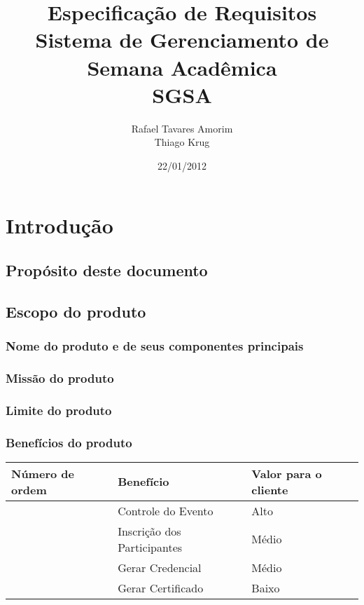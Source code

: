 \documentclass[12pt,a4paper]{article}
\begin{document}
    \title{
    	Especificação de Requisitos \\ 
    	Sistema de Gerenciamento de Semana Acadêmica \\
    	SGSA
    }
    \author{Rafael Tavares Amorim \\ Thiago Krug}
    \date{22/01/2012}
    \maketitle

	\clearpage
    
    \tableofcontents
    
    \clearpage
    \section{Introdução}
    	\subsection{Propósito deste documento}
        \subsection{Escopo do produto}
        	\subsubsection{Nome do produto e de seus componentes principais}
        	\subsubsection{Missão do produto}
        	\subsubsection{Limite do produto}
        	\subsubsection{Benefícios do produto}
        	\begin{table}[h]
	        	\noindent\begin{tabular}{|p{}|p{}|p{}|}
	        		\hline
	        		\setcounter{Number}{0}
	        	    \textbf{Número de ordem} & \textbf{Benefício} & \textbf{Valor para o cliente} \\
	        		\hline
	        		\Item & Controle do Evento & Alto \\
	        		\hline
	        		\Item & Inscrição dos Participantes & Médio \\
	        		\hline
	        		\Item & Gerar Credencial & Médio \\
	        		\hline
	        		\Item & Gerar Certificado & Baixo \\
	        		\hline
	        	\end{tabular}
        	\end{table}
        	
\end{document}
